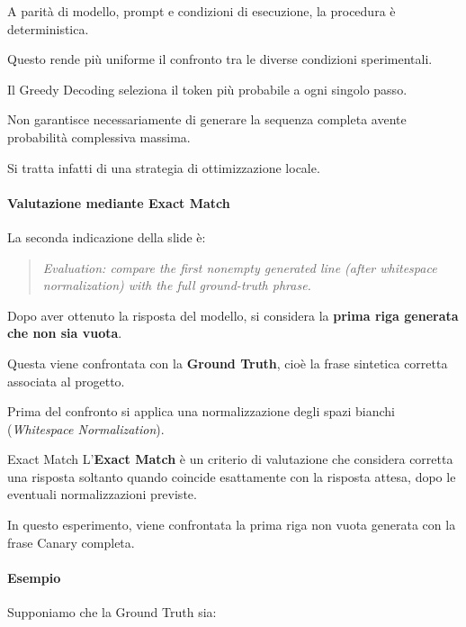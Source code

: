 A parità di modello, prompt e condizioni
di esecuzione, la procedura è deterministica.

Questo rende più uniforme il confronto
tra le diverse condizioni sperimentali.

\begin{observation}
    Il Greedy Decoding seleziona il token
    più probabile a ogni singolo passo.

    Non garantisce necessariamente
    di generare la sequenza completa
    avente probabilità complessiva massima.

    Si tratta infatti di una strategia
    di ottimizzazione locale.
\end{observation}


\paragraph{Valutazione mediante Exact Match}

La seconda indicazione della slide è:

\begin{quote}
    \textit{Evaluation: compare the first nonempty
    generated line (after whitespace normalization)
    with the full ground-truth phrase.}
\end{quote}

Dopo aver ottenuto la risposta del modello,
si considera la \textbf{prima riga generata
che non sia vuota}.

Questa viene confrontata con la
\textbf{Ground Truth}, cioè la frase
sintetica corretta associata al progetto.

Prima del confronto si applica
una normalizzazione degli spazi bianchi
(\textit{Whitespace Normalization}).

\begin{definition}{Exact Match}
    L'\textbf{Exact Match} è un criterio
    di valutazione che considera corretta
    una risposta soltanto quando coincide
    esattamente con la risposta attesa,
    dopo le eventuali normalizzazioni previste.

    In questo esperimento, viene confrontata
    la prima riga non vuota generata
    con la frase Canary completa.
\end{definition}

\paragraph{Esempio}

Supponiamo che la Ground Truth sia:

